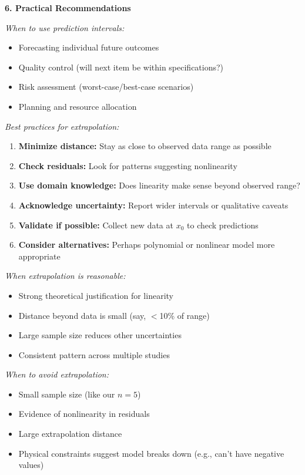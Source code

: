 \documentclass[12pt]{article}
\begin{document}
\begin{explanation}
\textbf{6. Practical Recommendations}

\textit{When to use prediction intervals:}

\begin{itemize}
    \item Forecasting individual future outcomes
    \item Quality control (will next item be within specifications?)
    \item Risk assessment (worst-case/best-case scenarios)
    \item Planning and resource allocation
\end{itemize}

\textit{Best practices for extrapolation:}

\begin{enumerate}
    \item \textbf{Minimize distance:} Stay as close to observed data range as possible
    \item \textbf{Check residuals:} Look for patterns suggesting nonlinearity
    \item \textbf{Use domain knowledge:} Does linearity make sense beyond observed range?
    \item \textbf{Acknowledge uncertainty:} Report wider intervals or qualitative caveats
    \item \textbf{Validate if possible:} Collect new data at $x_0$ to check predictions
    \item \textbf{Consider alternatives:} Perhaps polynomial or nonlinear model more appropriate
\end{enumerate}

\textit{When extrapolation is reasonable:}

\begin{itemize}
    \item Strong theoretical justification for linearity
    \item Distance beyond data is small (say, $<$10\% of range)
    \item Large sample size reduces other uncertainties
    \item Consistent pattern across multiple studies
\end{itemize}

\textit{When to avoid extrapolation:}

\begin{itemize}
    \item Small sample size (like our $n = 5$)
    \item Evidence of nonlinearity in residuals
    \item Large extrapolation distance
    \item Physical constraints suggest model breaks down (e.g., can't have negative values)
\end{itemize}


\end{explanation}
\end{document}
